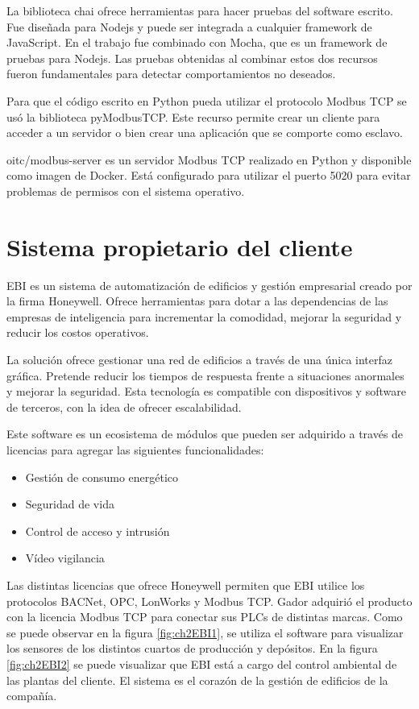 La biblioteca chai ofrece herramientas para hacer pruebas del software escrito.
Fue diseñada para Nodejs y puede ser integrada a cualquier framework de JavaScript.
En el trabajo fue combinado con Mocha, que es un framework de pruebas para Nodejs.
Las pruebas obtenidas al combinar estos dos recursos fueron fundamentales para detectar comportamientos no deseados.

Para que el código escrito en Python pueda utilizar el protocolo Modbus TCP se usó la biblioteca pyModbusTCP.
Este recurso permite crear un cliente para acceder a un servidor o bien crear una aplicación que se comporte como esclavo.

oitc/modbus-server es un servidor Modbus TCP realizado en Python y disponible como imagen de Docker.
Está configurado para utilizar el puerto 5020 para evitar problemas de permisos con el sistema operativo. \citep{WEBSITE:dockerhubModbus}

\section{Sistema propietario del cliente}

EBI es un sistema de automatización de edificios y gestión empresarial creado por la firma Honeywell.
Ofrece herramientas para dotar a las dependencias de las empresas de inteligencia para incrementar la comodidad, mejorar la seguridad y reducir los costos operativos.

La solución ofrece gestionar una red de edificios a través de una única interfaz gráfica. Pretende reducir los tiempos de respuesta frente a situaciones anormales y mejorar la seguridad.
Esta tecnología es compatible con dispositivos y software de terceros, con la idea de ofrecer escalabilidad.

Este software es un ecosistema de módulos que pueden ser adquirido a través de licencias para agregar las siguientes funcionalidades:

\begin{itemize}
	\item Gestión de consumo energético
	\item Seguridad de vida
	\item Control de acceso y intrusión
	\item Vídeo vigilancia
\end{itemize}

Las distintas licencias que ofrece Honeywell permiten que EBI utilice los protocolos BACNet, OPC, LonWorks y Modbus TCP.
Gador adquirió el producto con la licencia Modbus TCP para conectar sus PLCs de distintas marcas.
Como se puede observar en la figura \ref{fig:ch2EBI1}, se utiliza el software para visualizar los sensores de los distintos cuartos de producción y depósitos.
En la figura \ref{fig:ch2EBI2} se puede visualizar que EBI está a cargo del control ambiental de las plantas del cliente.
El sistema es el corazón de la gestión de edificios de la compañía.

